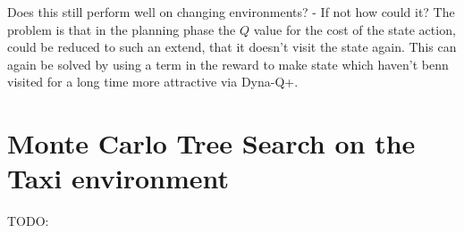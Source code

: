 \documentclass{article}
\begin{document}
Does this still perform well on changing environments? - If not how could it? The problem is that in the planning phase the $Q$ value for the cost of the state action, could be reduced to such an extend, that it doesn't visit the state again. This can again be solved by using a term in the reward to make state which haven't benn visited for a long time more attractive via Dyna-Q+.



\section{Monte Carlo Tree Search on the Taxi environment}


TODO:
\end{document}
